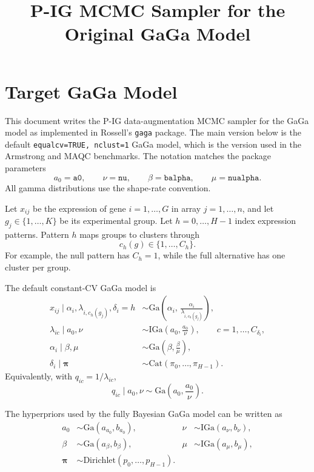 \documentclass[11pt]{article}
\title{P-IG MCMC Sampler for the Original GaGa Model}
\author{}
\date{}
\newcommand{\Ga}{\mathrm{Ga}}
\newcommand{\IGa}{\mathrm{IGa}}
\newcommand{\Cat}{\mathrm{Cat}}
\newcommand{\Dir}{\mathrm{Dirichlet}}
\begin{document}
\maketitle

\section{Target GaGa Model}

This document writes the P-IG data-augmentation MCMC sampler for the
GaGa model as implemented in Rossell's \texttt{gaga} package.  The main
version below is the default \texttt{equalcv=TRUE, nclust=1} GaGa model,
which is the version used in the Armstrong and MAQC benchmarks.  The notation
matches the package parameters
\[
  a_0=\texttt{a0}, \qquad \nu=\texttt{nu}, \qquad
  \beta=\texttt{balpha}, \qquad \mu=\texttt{nualpha}.
\]
All gamma distributions use the shape-rate convention.

Let \(x_{ij}\) be the expression of gene \(i=1,\ldots,G\) in array
\(j=1,\ldots,n\), and let \(g_j\in\{1,\ldots,K\}\) be its experimental group.
Let \(h=0,\ldots,H-1\) index expression patterns.  Pattern \(h\) maps groups
to clusters through
\[
  c_h(g)\in\{1,\ldots,C_h\}.
\]
For example, the null pattern has \(C_h=1\), while the full alternative has
one cluster per group.

The default constant-CV GaGa model is
\begin{align}
  x_{ij}\mid \alpha_i,\lambda_{i,c_h(g_j)},\delta_i=h
    &\sim \Ga\!\left(\alpha_i,\,
      \frac{\alpha_i}{\lambda_{i,c_h(g_j)}}\right),
      \label{eq:obs}\\
  \lambda_{ic}\mid a_0,\nu
    &\sim \IGa\!\left(a_0,\frac{a_0}{\nu}\right),
      \qquad c=1,\ldots,C_{\delta_i}, \label{eq:lambda-prior}\\
  \alpha_i\mid \beta,\mu
    &\sim \Ga\!\left(\beta,\frac{\beta}{\mu}\right),
      \label{eq:alpha-prior}\\
  \delta_i\mid \bm\pi
    &\sim \Cat(\pi_0,\ldots,\pi_{H-1}). \label{eq:pattern-prior}
\end{align}
Equivalently, with \(q_{ic}=1/\lambda_{ic}\),
\[
  q_{ic}\mid a_0,\nu \sim \Ga\!\left(a_0,\frac{a_0}{\nu}\right).
\]

The hyperpriors used by the fully Bayesian GaGa model can be written as
\begin{align}
  a_0 &\sim \Ga(a_{a_0},b_{a_0}), &
  \nu &\sim \IGa(a_\nu,b_\nu), \nonumber\\
  \beta &\sim \Ga(a_\beta,b_\beta), &
  \mu &\sim \IGa(a_\mu,b_\mu), \nonumber\\
  \bm\pi &\sim \Dir(p_0,\ldots,p_{H-1}). \label{eq:hyperpriors}
\end{align}
\end{document}
